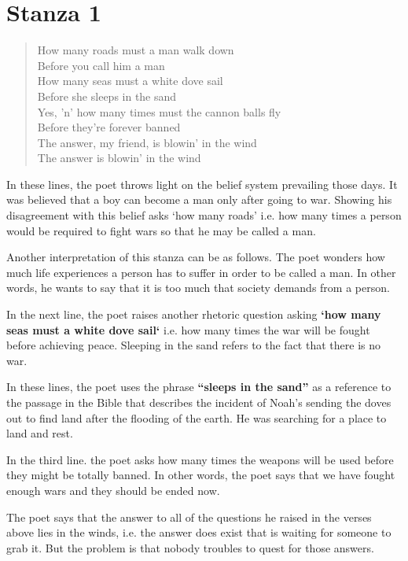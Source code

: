\documentclass[a4paper,12pt]{book}
\begin{document}
\section{Stanza 1}
\label{sec:orgc0b0d56}

\begin{verse}
How many roads must a man walk down\\[0pt]
Before you call him a man\\[0pt]
How many seas must a white dove sail\\[0pt]
Before she sleeps in the sand\\[0pt]
Yes, 'n' how many times must the cannon balls fly\\[0pt]
Before they're forever banned\\[0pt]
The answer, my friend, is blowin' in the wind\\[0pt]
The answer is blowin' in the wind\\[0pt]
\end{verse}

In these lines, the poet throws light on the belief system prevailing those days. It was believed that a boy can become a man only after going to war. Showing his disagreement with this belief asks ‘how many roads’ i.e. how many times a person would be required to fight wars so that he may be called a man.

Another interpretation of this stanza can be as follows. The poet wonders how much life experiences a person has to suffer in order to be called a man. In other words, he wants to say that it is too much that society demands from a person.

In the next line, the poet raises another rhetoric question asking \textbf{‘how many seas must a white dove sail‘} i.e. how many times the war will be fought before achieving peace. Sleeping in the sand refers to the fact that there is no war.

In these lines, the poet uses the phrase \textbf{“sleeps in the sand”} as a reference to the passage in the Bible that describes the incident of Noah’s sending the doves out to find land after the flooding of the earth. He was searching for a place to land and rest.

In the third line. the poet asks how many times the weapons will be used before they might be totally banned. In other words, the poet says that we have fought enough wars and they should be ended now.

The poet says that the answer to all of the questions he raised in the verses above lies in the winds, i.e. the answer does exist that is waiting for someone to grab it. But the problem is that nobody troubles to quest for those answers.
\end{document}
